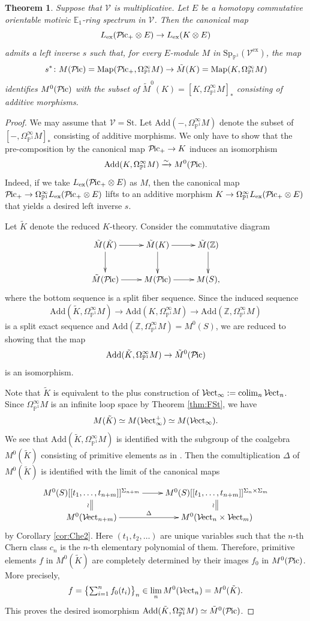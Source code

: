 \documentclass{amsart}
\theoremstyle{plain}
\newtheorem{theorem}{Theorem}[subsection]
\theoremstyle{definition}
\theoremstyle{remark}
\numberwithin{equation}{theorem}
\newcommand{\mbb}[1]{\mathbb{#1}}
\newcommand{\Add}{\mathrm{Add}}
\newcommand{\St}{\mathrm{St}}
\newcommand{\V}{\mathcal{V}}
\newcommand{\ex}{\mathrm{ex}}
\newcommand{\OmegaP}{\Omega_{\mathbb{P}^1}}
\newcommand{\SpP}{\mathrm{Sp}_{\mathbb{P}^1}}
\newcommand{\Pic}{{\mathcal{P}\mspace{-2.0mu}\mathrm{ic}}}
\newcommand{\Vect}{{\mathcal{V}\mspace{-2.0mu}\mathrm{ect}}}
\newcommand{\Map}{\operatorname{Map}}
\newcommand{\colim}{\operatorname*{colim}}
\begin{document}
\begin{theorem}\label{thm:CoK}
Suppose that $\V$ is multiplicative.
Let $E$ be a homotopy commutative orientable motivic $\mbb{E}_1$-ring spectrum in $\V$.
Then the canonical map
\[
	L_\ex(\Pic_+\otimes E) \to L_\ex(K\otimes E)
\]
admits a left inverse $s$ such that, for every $E$-module $M$ in $\SpP(\V^\ex)$, the map
\[
	s^* \colon M(\Pic)=\Map(\Pic_+,\OmegaP^\infty M) \to \tilde{M}(K)=\Map(K,\OmegaP^\infty M)
\]
identifies $M^0(\Pic)$ with the subset of $\tilde{M}^0(K)=[K,\OmegaP^\infty M]_*$ consisting of additive morphisms.
\end{theorem}
\begin{proof}
We may assume that $\V=\St$.
Let $\Add(-,\OmegaP^\infty M)$ denote the subset of $[-,\OmegaP^\infty M]_*$ consisting of additive morphisms.
We only have to show that the pre-composition by the canonical map $\Pic_+\to K$ induces an isomorphism
\[
	\Add(K,\OmegaP^\infty M) \xrightarrow{\sim} M^0(\Pic).
\]
Indeed, if we take $L_\ex(\Pic_+\otimes E)$ as $M$, then the canonical map $\Pic_+\to\OmegaP^\infty L_\ex(\Pic_+\otimes E)$ lifts to an additive morphism $K\to\OmegaP^\infty L_\ex(\Pic_+\otimes E)$ that yields a desired left inverse $s$.

Let $\tilde{K}$ denote the reduced $K$-theory.
Consider the commutative diagram
\[
\xymatrix{
	\tilde{M}(\tilde{K}) \ar[r] \ar[d] & \tilde{M}(K) \ar[r] \ar[d] & \tilde{M}(\mbb{Z}) \ar[d] \\
	\tilde{M}(\Pic) \ar[r] & M(\Pic) \ar[r] & M(S),
}
\]
where the bottom sequence is a split fiber sequence.
Since the induced sequence
\[
	\Add(\tilde{K},\OmegaP^\infty M) \to \Add(K,\OmegaP^\infty M) \to \Add(\mbb{Z},\OmegaP^\infty M)
\]
is a split exact sequence and $\Add(\mbb{Z},\OmegaP^\infty M)=M^0(S)$, we are reduced to showing that the map
\[
	\Add(\tilde{K},\OmegaP^\infty M) \to \tilde{M}^0(\Pic)
\]
is an isomorphism.

Note that $\tilde{K}$ is equivalent to the plus construction of $\Vect_\infty:=\colim_n\Vect_n$.
Since $\OmegaP^\infty M$ is an infinite loop space by Theorem \ref{thm:FSt}, we have
\[
	M(\tilde{K}) \simeq M(\Vect_\infty^+) \simeq M(\Vect_\infty).
\]
We see that $\Add(\tilde{K},\OmegaP^\infty M)$ is identified with the subgroup of the coalgebra $M^0(\tilde{K})$ consisting of primitive elements as in \cite[Lemma 2.25]{GS}.
Then the comultiplication $\Delta$ of $M^0(\tilde{K})$ is identified with the limit of the canonical maps
\[
\xymatrix@R-1pc{
	M^0(S)[[t_1,\dotsc,t_{n+m}]]^{\Sigma_{n+m}} \ar[r] \ar@{=}[d]_\wr & M^0(S)[[t_1,\dotsc,t_{n+m}]]^{\Sigma_n\times\Sigma_m} \ar@{=}[d]_\wr \\
	M^0(\Vect_{n+m}) \ar[r]^-\Delta & M^0(\Vect_n\times\Vect_m)
}
\]
by Corollary \ref{cor:Che2}.
Here $(t_1,t_2,\dotsc)$ are unique variables such that the $n$-th Chern class $c_n$ is the $n$-th elementary polynomial of them.
Therefore, primitive elements $f$ in $M^0(\tilde{K})$ are completely determined by their images $f_0$ in $M^0(\Pic)$.
More precisely, 
\[
	f = \bigl\{ {\textstyle\sum_{i=1}^nf_0(t_i)} \bigr\}_n \in \lim_n M^0(\Vect_n) = M^0(\tilde{K}).
\]
This proves the desired isomorphism $\Add(\tilde{K},\OmegaP^\infty M)\simeq\tilde{M}^0(\Pic)$.
\end{proof}
\end{document}
